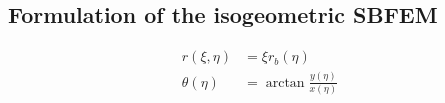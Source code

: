 \subsection{Formulation of the isogeometric SBFEM}

    \begin{subequations}
        \begin{align}
            r(\xi,\eta) &= \xi r_b(\eta) \\
            \theta(\eta) &= \arctan \frac{y(\eta)}{x(\eta)}
        \end{align}
    \label{eq:isosbfem_coordinate_transformation}
    \end{subequations}

\pagebreak